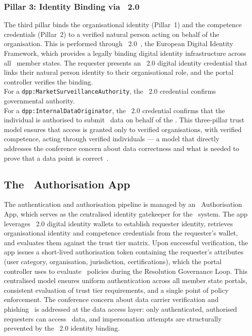 \subsubsection{Pillar 3: Identity Binding via \eIDAS\ 2.0}

The third pillar binds the organisational identity (Pillar~1) and the competence
credentials (Pillar~2) to a verified natural person acting on behalf of the
organisation. This is performed through \eIDAS~2.0~\cite{eidas2}, the European
Digital Identity Framework, which provides a legally binding digital identity
infrastructure across all \EU\ member states. The requester presents an
\eIDAS~2.0 digital identity credential that links their natural person identity
to their organisational role, and the portal controller verifies the binding.
\\
For a \texttt{dpp:MarketSurveillanceAuthority}, the \eIDAS~2.0 credential
confirms governmental authority.
\\
For a \texttt{dpp:InternalDataOriginator}, the \eIDAS~2.0 credential confirms
that the individual is authorised to submit \DPP\ data on behalf of the \REO.
This three-pillar trust model ensures that access is granted only to verified
organisations, with verified competence, acting through verified individuals ---
a model that directly addresses the conference concern about data correctness
and what is needed to prove that a data point is correct~\cite{dpp4eu2026_day1}.

\subsection{The \EC\ Authorisation App}

The authentication and authorisation pipeline is managed by an \EC\
Authorisation App, which serves as the centralised identity gatekeeper for the
\DPP\ system. The app leverages \eIDAS~2.0 digital identity wallets to establish
requester identity, retrieves organisational identity and competence credentials
from the requester's wallet, and evaluates them against the trust tier matrix.
Upon successful verification, the app issues a short-lived authorisation token
containing the requester's attributes (user category, organisation,
jurisdiction, certifications), which the portal controller uses to evaluate
\ODRL\ policies during the Resolution Governance Loop. This centralised model
ensures uniform authentication across all member state portals, consistent
evaluation of trust tier requirements, and a single point of policy enforcement.
The conference concern about data carrier verification and
phishing~\cite{dpp4eu2026_day1} is addressed at the data access layer: only
authenticated, authorised requesters can access \DPP\ data, and impersonation
attempts are structurally prevented by the \eIDAS~2.0 identity binding.

